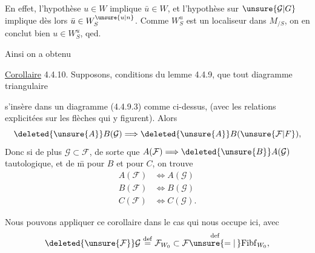 
En effet,  l'hypothèse  $u\in W$ implique $\bar u\in W$, et l'hypothèse sur $\unsure{\mathcal{G}|G}$ implique dès lors $\bar u\in W_S^{\unsure{u|n}}$. Comme $W_S^u$ est un localiseur dans $M_{/S}$, on en conclut bien $u\in W_S^u$, qed.

Ainsi on a obtenu


\uline{Corollaire} 4.4.10. Supposons,  conditions  du lemme 4.4.9, que tout diagramme  triangulaire


s'insère dans un diagramme  (4.4.9.3) comme ci-dessus, (avec les relations explicitées sur les flèches qui y figurent). Alors
\[
 \deleted{\unsure{A}}B(\mathcal{G})\Longrightarrow \deleted{\unsure{A}}B(\unsure{\mathcal{F}|F}),
\]
Donc si de plus $\mathcal{G}\subset\mathcal{F}$,  de sorte que $A(\mathcal{F})\Longrightarrow \deleted{\unsure{B}}A(\mathcal{G})$  tautologique, et de \={m} pour $B$ et pour $C$, on trouve
\[
 \begin{aligned}
 A(\mathcal{F})&\Longleftrightarrow A(\mathcal{G})\\
 B(\mathcal{F})&\Longleftrightarrow B(\mathcal{G})\\
 C(\mathcal{F})&\Longleftrightarrow C(\mathcal{G}).
 \end{aligned}
\]

Nous pouvons appliquer ce corollaire dans le cas qui nous occupe ici, avec
\[
 \deleted{\unsure{\mathcal{F}}}\mathcal{G}\overset{\mathrm{def}}{=}\mathcal{F}_{W_0}
 \subset\mathcal{F}\overset{\mathrm{def}}{\unsure{=|\,}}\mathrm{Fibf}_{W_0},
\]
